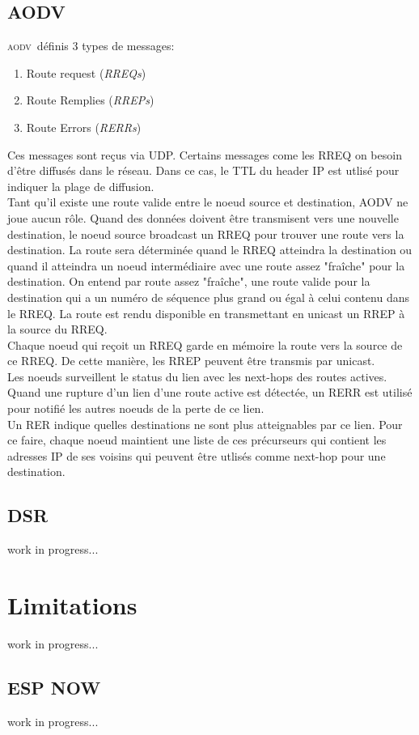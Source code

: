 \documentclass[a4paper, 12pt]{report}
\newcommand{\aodv}{\textsc{aodv}}
\begin{document}
    \subsection{AODV}
        \aodv\ définis 3 types de messages:
        \begin{enumerate}
            \item Route request (\textit{RREQs})\\
            \item Route Remplies (\textit{RREPs})
            \item Route Errors (\textit{RERRs})
        \end{enumerate}
        Ces messages sont reçus via UDP. Certains messages come les RREQ on besoin d'être diffusés dans le réseau.
        Dans ce cas, le TTL du header IP est utlisé pour indiquer la plage de diffusion.\\
        Tant qu'il existe une route valide entre le noeud source et destination, AODV ne joue aucun rôle.
        Quand des données doivent être transmisent vers une nouvelle destination, le noeud source broadcast un RREQ
        pour trouver une route vers la destination.
        La route sera déterminée quand le RREQ atteindra la destination ou quand il 
        atteindra un noeud intermédiaire avec une route assez "fraîche" pour la destination.
        On entend par route assez "fraîche", une route valide pour la destination qui a un numéro de séquence plus grand ou égal à celui contenu dans le RREQ.
        La route est rendu disponible en transmettant en unicast un RREP à la source du RREQ.\\
        Chaque noeud qui reçoit un RREQ garde en mémoire la route vers la source de ce RREQ. De cette manière,
        les RREP peuvent être transmis par unicast.\\
        Les noeuds surveillent le status du lien avec les next-hops des routes actives.
        Quand une rupture d'un lien d'une route active est détectée, un RERR est utilisé
        pour notifié les autres noeuds de la perte de ce lien.\\
        Un RER indique quelles destinations ne sont plus atteignables par ce lien. Pour ce faire,
        chaque noeud maintient une liste de ces précurseurs qui contient les adresses IP de ses voisins qui peuvent être utlisés comme next-hop pour une destination.




    \subsection{DSR}
        work in progress...

\section{Limitations}
        work in progress...

    \subsection{ESP NOW}
        work in progress...

{}

\end{document}
